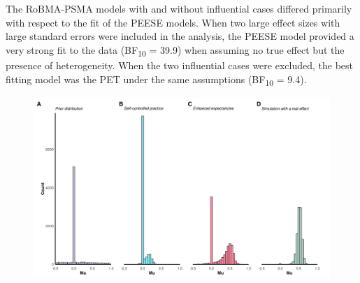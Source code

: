 \documentclass[
  doc, donotrepeattitle,floatsintext]{apa7}
\begin{document}
The RoBMA-PSMA models with and without influential cases differed primarily with respect to the fit of the PEESE models. When two large effect sizes with large standard errors were included in the analysis, the PEESE model provided a very strong fit to the data (BF\textsubscript{10} = 39.9) when assuming no true effect but the presence of heterogeneity. When the two influential cases were excluded, the best fitting model was the PET under the same assumptions (BF\textsubscript{10} = 9.4).

\clearpage

\begin{figure}

{\centering \includegraphics{../../figs/fig2} 

}


\end{figure}
\end{document}
